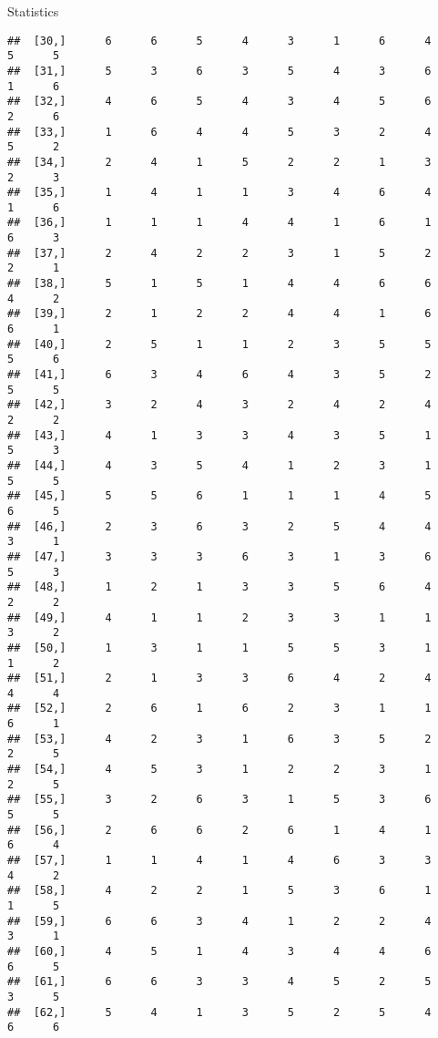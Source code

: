 \documentclass[
  ignorenonframetext,
]{beamer}
\begin{document}
\begin{frame}[fragile]{Statistics}
\begin{verbatim}
##  [30,]      6      6      5      4      3      1      6      4      5      5
##  [31,]      5      3      6      3      5      4      3      6      1      6
##  [32,]      4      6      5      4      3      4      5      6      2      6
##  [33,]      1      6      4      4      5      3      2      4      5      2
##  [34,]      2      4      1      5      2      2      1      3      2      3
##  [35,]      1      4      1      1      3      4      6      4      1      6
##  [36,]      1      1      1      4      4      1      6      1      6      3
##  [37,]      2      4      2      2      3      1      5      2      2      1
##  [38,]      5      1      5      1      4      4      6      6      4      2
##  [39,]      2      1      2      2      4      4      1      6      6      1
##  [40,]      2      5      1      1      2      3      5      5      5      6
##  [41,]      6      3      4      6      4      3      5      2      5      5
##  [42,]      3      2      4      3      2      4      2      4      2      2
##  [43,]      4      1      3      3      4      3      5      1      5      3
##  [44,]      4      3      5      4      1      2      3      1      5      5
##  [45,]      5      5      6      1      1      1      4      5      6      5
##  [46,]      2      3      6      3      2      5      4      4      3      1
##  [47,]      3      3      3      6      3      1      3      6      5      3
##  [48,]      1      2      1      3      3      5      6      4      2      2
##  [49,]      4      1      1      2      3      3      1      1      3      2
##  [50,]      1      3      1      1      5      5      3      1      1      2
##  [51,]      2      1      3      3      6      4      2      4      4      4
##  [52,]      2      6      1      6      2      3      1      1      6      1
##  [53,]      4      2      3      1      6      3      5      2      2      5
##  [54,]      4      5      3      1      2      2      3      1      2      5
##  [55,]      3      2      6      3      1      5      3      6      5      5
##  [56,]      2      6      6      2      6      1      4      1      6      4
##  [57,]      1      1      4      1      4      6      3      3      4      2
##  [58,]      4      2      2      1      5      3      6      1      1      5
##  [59,]      6      6      3      4      1      2      2      4      3      1
##  [60,]      4      5      1      4      3      4      4      6      6      5
##  [61,]      6      6      3      3      4      5      2      5      3      5
##  [62,]      5      4      1      3      5      2      5      4      6      6

\end{verbatim}
\end{frame}
\end{document}
